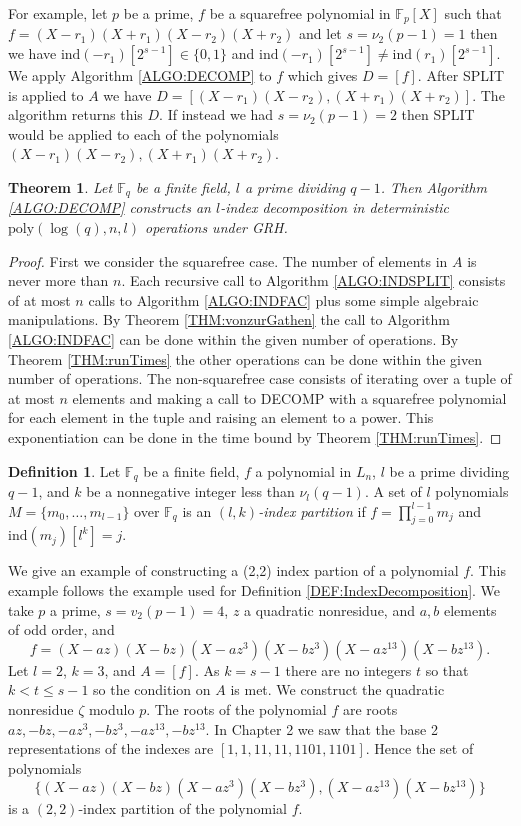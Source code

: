 \documentclass{article}
\newcounter{dummy} \numberwithin{dummy}{section}
\theoremstyle{plain}
\newtheorem{thm}[dummy]{Theorem}
\theoremstyle{definition}
\newtheorem{mydef}[dummy]{Definition}
\def\Fp {{ \mathbb{F} _ {p} }}
\def\Fq {{ \mathbb{F} _ {q} }}
\def\ind {{ \mathrm{ind} }}
\def\poly {{ \mathrm{poly} }}
\begin{document}
		For example, let $p$ be a prime, $f$ be a squarefree polynomial in $\Fp[X]$ such that $f=(X-r_1)(X+r_1)(X-r_2)(X+r_2)$ and let $s=\nu_2(p-1)=1$ then we have $\ind(-r_1)[2^{s-1}] \in \{0,1\}$ and $\ind(-r_1)[2^{s-1}] \not= \ind(r_1)[2^{s-1}]$. We apply Algorithm \ref{ALGO:DECOMP} to $f$ which gives $D=[f]$. After SPLIT is applied to $A$ we have $D=[(X-r_1)(X-r_2),(X+r_1)(X+r_2)]$. The algorithm returns this $D$. If instead we had $s=\nu_2(p-1)=2$ then SPLIT would be applied to each of the polynomials $(X-r_1)(X-r_2),(X+r_1)(X+r_2)$.
						
		\begin{thm}
		\label{THM:DECOMP}
		    Let $\Fq$ be a finite field, $l$ a prime dividing $q-1$. Then Algorithm \ref{ALGO:DECOMP} constructs an $l$-index decomposition in deterministic $\poly(\log(q),n,l)$ operations under GRH.
		\end{thm}
		
		\begin{proof}
		    First we consider the squarefree case. The number of elements in $A$ is never more than $n$. Each recursive call to Algorithm \ref{ALGO:INDSPLIT} consists of at most $n$ calls to Algorithm \ref{ALGO:INDFAC} plus some simple algebraic manipulations. By Theorem \ref{THM:vonzurGathen} the call to Algorithm \ref{ALGO:INDFAC} can be done within the given number of operations. By Theorem \ref{THM:runTimes} the other operations can be done within the given number of operations. The non-squarefree case consists of iterating over a tuple of at most $n$ elements and making a call to DECOMP with a squarefree polynomial for each element in the tuple and raising an element to a power. This exponentiation can be done in the time bound by Theorem \ref{THM:runTimes}. 
		\end{proof}
							
		\begin{mydef}
		\label{DEF:IndexPartition}
		    Let $\Fq$ be a finite field, $f$ a polynomial in $L_n$, $l$ be a prime dividing $q-1$, and $k$ be a nonnegative integer less than $\nu_l(q-1)$. A set of $l$ polynomials $M=\{m_0,\ldots,m_{l-1} \}$ over $\Fq$ is an \emph{$(l,k)$-index partition} if $f=\prod_{j=0}^{l-1}{m_j}$ and $\ind(m_j)[l^k]=j$. 
		\end{mydef}
		
		We give an example of constructing a (2,2) index partion of a polynomial $f$. This example follows the example used for Definition \ref{DEF:IndexDecomposition}. We take $p$ a prime, $s=v_2(p-1)=4$, $z$ a quadratic nonresidue, and $a, b$ elements of odd order, and 
		\[ f=(X-az)(X-bz)(X-az^3)(X-bz^3)(X-az^{13})(X-bz^{13}).\] Let $l=2$, $k=3$, and $A=[f]$. As $k=s-1$ there are no integers $t$ so that $k<t\leq s-1$ so the condition on $A$ is met. We construct the quadratic nonresidue $\zeta$ modulo $p$. The roots of the polynomial $f$ are roots $az,-bz,-az^3,-bz^3,-az^{13},-bz^{13}$. In Chapter 2 we saw that the base 2 representations of the indexes are $[1,1,11,11,1101,1101]$. Hence the set of polynomials 
		\[ \{ (X-az)(X-bz)(X-az^3)(X-bz^3),(X-az^{13})(X-bz^{13}) \}\]
		\noindent is a $(2,2)$-index partition of the polynomial $f$.
		
\end{document}

